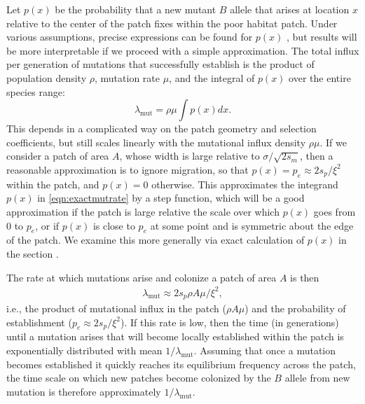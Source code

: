 \documentclass{article}
\newcommand{\linelabel}[1]{}
\newcommand{\citep}[1]{\cite{#1}}
\newcommand{\mutrate}{\lambda_\text{mut}}
\newcommand{\secref}[1]{{\emph{\nameref{#1}}}}
\begin{document}
Let $p(x)$ be the probability that a new mutant $B$ allele that arises at location $x$
relative to the center of the patch fixes within the poor habitat patch.
Under various assumptions, precise expressions can be found for $p(x)$ \citep{barton1987establishment},
but results will be more interpretable if we proceed with a simple approximation.
The total influx per generation of mutations that successfully establish is 
the product of population density $\rho$, mutation rate $\mu$, and the
integral of $p(x)$ over the entire species range:
\begin{equation}
  \mutrate = \rho \mu \int p(x) dx \label{eqn:exactmutrate} .
\end{equation}
This depends in a complicated way on the patch geometry and selection coefficients,
but still scales linearly with the mutational influx density $\rho \mu$.
If we consider a patch of area $A$, whose width is large relative to $\sigma/\sqrt{2s_m}$, 
then a reasonable approximation is to ignore migration, 
so that $p(x) = p_e \approx 2 s_p / \xi^2$ within the patch, and $p(x) = 0$ otherwise.
This approximates the integrand $p(x)$ in \eqref{eqn:exactmutrate} by a step function,
which will be a good approximation if the patch is large relative the scale over which $p(x)$ goes from 0 to $p_e$,
or if $p(x)$ is close to $p_e$ at some point and is symmetric about the edge of the patch. \linelabel{rr:p_estab}
We examine this more generally via exact calculation of $p(x)$ in the section \secref{apx:establishment_sims}.

The rate at which mutations arise and colonize a patch of area $A$ is then
\begin{align} \label{eqn:mutrate} 
  \mutrate %
  \approx 2 s_p \rho A \mu / \xi^2,  
\end{align}
i.e., the product of mutational influx in the patch ($\rho A\mu$) and the probability of establishment ($p_e \approx 2s_p/\xi^2$).
If this rate is low, then the time (in generations) until a mutation arises that
will become locally established within the patch is exponentially distributed with mean $1/\mutrate$.  
Assuming that once a mutation becomes established it quickly reaches its equilibrium frequency across the patch, 
the time scale on which new patches become colonized by the $B$ allele from new mutation is therefore approximately $1/\mutrate$.
\end{document}
